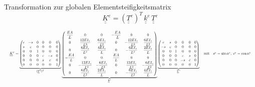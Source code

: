 \documentclass[aspectratio=169,professionalfonts]{beamer}
\begin{document}
\begin{frame}{Transformation zur globalen Elementsteifigkeitsmatrix}
  \centering
  \small
  \[
    \underline{\underline{K}}^{e}=(\underline{\underline{T}}^{e})^{T}\,\underline{\underline{k}}^{e}\,\underline{\underline{T}}^{e}
  \]

  \vspace{0.25em}
  \tiny
  \[
  \resizebox{\linewidth}{!}{$
  \underline{\underline{K}}^{e}=
  \underbrace{\begin{pmatrix}
    c & -s & 0 & 0 & 0 & 0\\
    s &  c & 0 & 0 & 0 & 0\\
    0 &  0 & 1 & 0 & 0 & 0\\
    0 &  0 & 0 & c & -s & 0\\
    0 &  0 & 0 & s &  c & 0\\
    0 &  0 & 0 & 0 &  0 & 1
  \end{pmatrix}}_{(\underline{\underline{T}}^{e})^{T}}
  \underbrace{\begin{pmatrix}
    \dfrac{EA}{L} & 0 & 0 & -\dfrac{EA}{L} & 0 & 0\\
    0 & \dfrac{12EI_z}{L^3} & \dfrac{6EI_z}{L^2} & 0 & -\dfrac{12EI_z}{L^3} & \dfrac{6EI_z}{L^2}\\
    0 & \dfrac{6EI_z}{L^2} & \dfrac{4EI_z}{L} & 0 & -\dfrac{6EI_z}{L^2} & \dfrac{2EI_z}{L}\\
    -\dfrac{EA}{L} & 0 & 0 & \dfrac{EA}{L} & 0 & 0\\
    0 & -\dfrac{12EI_z}{L^3} & -\dfrac{6EI_z}{L^2} & 0 & \dfrac{12EI_z}{L^3} & -\dfrac{6EI_z}{L^2}\\
    0 & \dfrac{6EI_z}{L^2} & \dfrac{2EI_z}{L} & 0 & -\dfrac{6EI_z}{L^2} & \dfrac{4EI_z}{L}
  \end{pmatrix}}_{\underline{\underline{k}}^{e}}
  \underbrace{\begin{pmatrix}
    c & s & 0 & 0 & 0 & 0\\
    -s & c & 0 & 0 & 0 & 0\\
    0 & 0 & 1 & 0 & 0 & 0\\
    0 & 0 & 0 & c & s & 0\\
    0 & 0 & 0 & -s & c & 0\\
    0 & 0 & 0 & 0 & 0 & 1
  \end{pmatrix}}_{\underline{\underline{T}}^{e}}
  \quad\text{mit}\quad
  s^{e}=\sin\alpha^{e},\; c^{e}=\cos\alpha^{e}
  $}
  \]
\end{frame}
\end{document}
